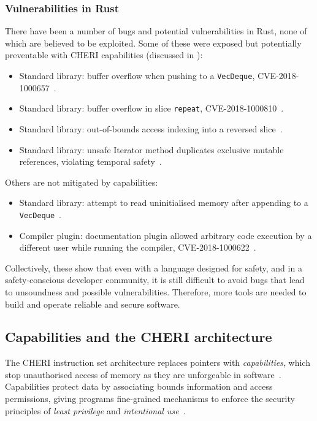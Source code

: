 \documentclass[dissertation.tex]{subfiles}
\begin{document}
\subsubsection{Vulnerabilities in Rust}
There have been a number of bugs and potential vulnerabilities in Rust,
none of which are believed to be exploited.
Some of these were exposed but potentially preventable with CHERI
capabilities (discussed in ):

\begin{itemize}
    \item Standard library: buffer overflow when pushing to a
    \texttt{VecDeque}, CVE-2018-1000657~\cite{cve-push,rust-issue-push}.
    \item Standard library: buffer overflow in slice \texttt{repeat},
    CVE-2018-1000810~\cite{cve-repeat,rust-advisory-repeat,rust-pr-slice}.
    \item Standard library: out-of-bounds access indexing into a
    reversed slice~\cite{rust-pr-reverse,rust-commit-reverse}.
    \item Standard library: unsafe Iterator method duplicates
    exclusive mutable references, violating temporal
    safety~\cite{rust-issue-vec-mut}.
\end{itemize}

Others are not mitigated by capabilities:

\begin{itemize}
    \item Standard library: attempt to read uninitialised memory after
    appending to a \texttt{VecDeque}~\cite{rust-issue-deque-append}.
    \item Compiler plugin: documentation plugin allowed arbitrary code
    execution by a different user while running the
    compiler, CVE-2018-1000622~\cite{cve-rustdoc,rust-advisory-rustdoc}.
\end{itemize}

Collectively, these show that even with a language designed for safety,
and in a safety-conscious developer community, it is still difficult to
avoid bugs that lead to unsoundness and possible vulnerabilities.
Therefore, more tools are needed to build and operate reliable and
secure software.


\subsection{Capabilities and the CHERI architecture}
The CHERI instruction set architecture replaces pointers with
\emph{capabilities}, which stop unauthorised access of memory as they are
unforgeable in software~\cite{cheri-v6}.
Capabilities protect data by associating bounds information and access
permissions, giving programs fine-grained mechanisms to enforce the
security principles of \emph{least privilege} and \emph{intentional
use}~\cite{neumann-principles}.
\end{document}
